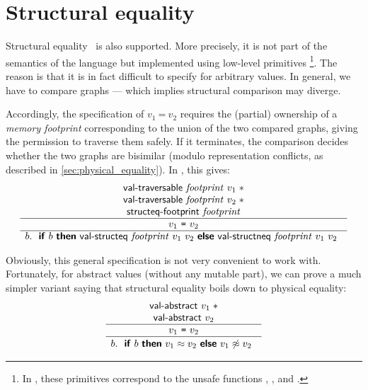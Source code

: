 \section{Structural equality}
\label{sec:structural_equality}

Structural equality~ is also supported.
More precisely, it is not part of the semantics of the language but implemented using low-level primitives%
\footnote{
In \OCaml, these primitives correspond to the unsafe functions , ,  and .
}.
The reason is that it is in fact difficult to specify for arbitrary values.
In general, we have to compare graphs --- which implies structural comparison may diverge.

Accordingly, the specification of $v_1\ \texttt{=}\ v_2$ requires the (partial) ownership of a \emph{memory footprint} corresponding to the union of the two compared graphs, giving the permission to traverse them safely.
If it terminates, the comparison decides whether the two graphs are bisimilar (modulo representation conflicts, as described in \cref{sec:physical_equality}).
In \Iris, this gives:
\[
  \begin{array}{c} \begin{array}{c} 
    \textsf{\upshape val-traversable}\ \mathit{footprint}\ v_1 \mathrel{\ast} \\
    \textsf{\upshape val-traversable}\ \mathit{footprint}\ v_2 \mathrel{\ast} \\
    \textsf{\upshape structeq-footprint}\ \mathit{footprint}
   \end{array} \\ \hline 
    v_1\ \texttt{=}\ v_2
   \\ \hline 
    b
   \ldotp \begin{array}[t]{c} 
    \textsf{\upshape \textbf{if}}\ 
      b
    \ \textsf{\upshape \textbf{then}}\ 
      \textsf{\upshape val-structeq}\ \mathit{footprint}\ v_1\ v_2
    \ \textsf{\upshape \textbf{else}}\ 
      \textsf{\upshape val-structneq}\ \mathit{footprint}\ v_1\ v_2
    
   \end{array} \end{array}
\]

Obviously, this general specification is not very convenient to work with.
Fortunately, for abstract values (without any mutable part), we can prove a much simpler variant saying that structural equality boils down to physical equality:
\[
  \iSpec{
    \textlog{val-abstract}\ v_1 \iSep \\
    \textlog{val-abstract}\ v_2
  }{
    v_1\ \texttt{=}\ v_2
  }{
    b
  }{
    \myifOneline{
      b
    }{
      v_1 \similar v_2
    }{
      v_1 \nonsimilar v_2
    }
  }
\]

